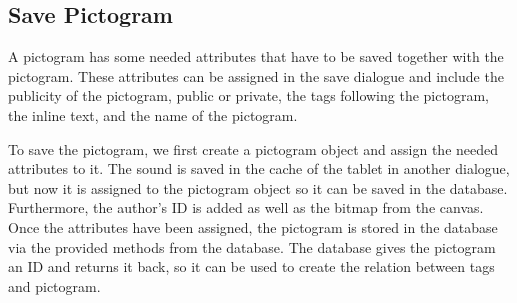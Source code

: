 \subsection{Save Pictogram}
A pictogram has some needed attributes that have to be saved together with the pictogram.
These attributes can be assigned in the save dialogue and include the publicity of the pictogram, public or private, the tags following the pictogram, the inline text, and the name of the pictogram.

To save the pictogram, we first create a pictogram object and assign the needed attributes to it.
The sound is saved in the cache of the tablet in another dialogue, but now it is assigned to the pictogram object so it can be saved in the database.
Furthermore, the author's ID is added as well as the bitmap from the canvas.
Once the attributes have been assigned, the pictogram is stored in the database via the provided methods from the database.
The database gives the pictogram an ID and returns it back, so it can be used to create the relation between tags and pictogram.